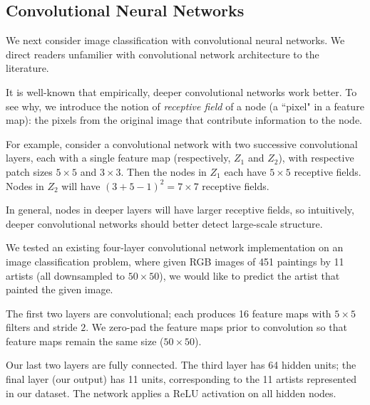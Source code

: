 \documentclass{article}
\begin{document}
\begin{multicols}{2}

\section{Convolutional Neural Networks}

We next consider image classification
with convolutional neural networks.
We direct readers unfamilier with convolutional network architecture
to the literature.

It is well-known that empirically,
deeper convolutional networks work better.
To see why, we introduce the notion of \emph{receptive field}
of a node (a ``pixel" in a feature map):
the pixels from the original image that contribute information
to the node.

For example,
consider a convolutional network
with two successive convolutional layers,
each with a single feature map (respectively, $Z_1$ and $Z_2$),
with respective patch sizes $5\times 5$ and $3\times 3$.
Then the nodes in $Z_1$ each have $5\times 5$ receptive fields.
Nodes in $Z_2$ will have $(3 + 5 - 1)^2 = 7\times 7$ receptive fields.

In general,
nodes in deeper layers will have larger receptive fields,
so intuitively,
deeper convolutional networks should better detect large-scale structure.

We tested an existing four-layer convolutional network implementation
on an image classification problem,
where given RGB images of 451 paintings by 11 artists
(all downsampled to $50\times 50$),
we would like to predict the artist that painted the given image.

The first two layers are convolutional;
each produces 16 feature maps
with $5\times 5$ filters and stride $2$.
We zero-pad the feature maps prior to convolution
so that feature maps remain the same size ($50\times 50$).

Our last two layers are fully connected.
The third layer has 64 hidden units;
the final layer (our output) has 11 units,
corresponding to the 11 artists represented in our dataset.
The network applies a ReLU activation on all hidden nodes.


\end{multicols}
\end{document}
